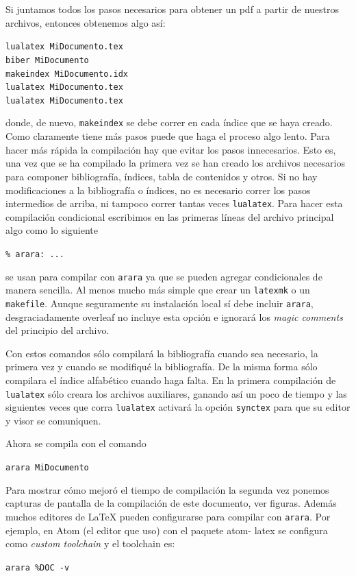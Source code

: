 Si juntamos todos los pasos necesarios para obtener un pdf a partir de nuestros archivos, entonces obtenemos algo así:
\begin{flushleft}
  \verb|lualatex MiDocumento.tex|\\
  \verb|biber MiDocumento|\\
  \verb|makeindex MiDocumento.idx|\\
  \verb|lualatex MiDocumento.tex|\\
  \verb|lualatex MiDocumento.tex|
\end{flushleft}
donde, de nuevo, \texttt{makeindex} se debe correr en cada índice que se haya
creado. Como claramente tiene más pasos puede que haga el proceso algo lento.
Para hacer más rápida la compilación hay que evitar los pasos innecesarios.
Esto es, una vez que se ha compilado la primera vez se han creado los
archivos necesarios para componer bibliografía, índices, tabla de contenidos y
otros. Si no hay modificaciones a la bibliografía o índices, no es necesario
correr los pasos intermedios de arriba, ni tampoco correr tantas veces
\texttt{lualatex}. Para hacer esta compilación condicional escribimos
en las primeras líneas del archivo principal algo como lo siguiente
\begin{flushleft}
  \verb|% arara: ...|
\end{flushleft}
se usan para compilar con \texttt{arara} ya que se pueden agregar
condicionales de manera sencilla. Al menos mucho más simple que crear un
\texttt{latexmk} o un \texttt{makefile}. Aunque seguramente su instalación
local sí debe incluir \texttt{arara}, desgraciadamente overleaf no incluye
esta opción e ignorará los \textit{magic comments} del principio del archivo.

Con estos comandos sólo compilará la bibliografía cuando sea necesario, la
primera vez y cuando se modifiqué la bibliografía. De la misma forma sólo
compilara el índice alfabético cuando haga falta. En la primera compilación
de \texttt{lualatex} sólo creara los archivos auxiliares, ganando así un
poco de tiempo y las siguientes veces que corra \texttt{lualatex} activará
la opción \texttt{synctex} para que su editor y visor se comuniquen.

Ahora se compila con el comando
\begin{flushleft}
  \verb|arara MiDocumento|
\end{flushleft}
Para mostrar cómo mejoró el tiempo de compilación la segunda
vez ponemos capturas de pantalla de la compilación de este documento, ver figuras.
Además muchos editores de \LaTeX{} pueden configurarse para compilar con
\texttt{arara}.  Por ejemplo, en Atom (el editor que uso) con el paquete atom-
latex se configura como \textit{custom toolchain} y el toolchain es:
\begin{flushleft}
  \verb|arara %DOC -v|
\end{flushleft}

